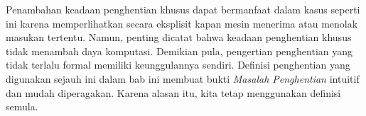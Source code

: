 \documentclass[../../../include/open-logic-section]{subfiles}
\begin{document}
\begin{explain}
Penambahan keadaan penghentian khusus dapat bermanfaat dalam kasus seperti
ini karena memperlihatkan secara eksplisit kapan mesin menerima atau menolak
masukan tertentu. Namun, penting dicatat bahwa keadaan penghentian khusus
tidak menambah daya komputasi. Demikian pula, pengertian penghentian yang tidak
terlalu formal memiliki keunggulannya sendiri. Definisi penghentian yang
digunakan sejauh ini dalam bab ini membuat bukti \emph{Masalah Penghentian}
intuitif dan mudah diperagakan. Karena alasan itu, kita tetap menggunakan
definisi semula.
\end{explain}
\end{document}
